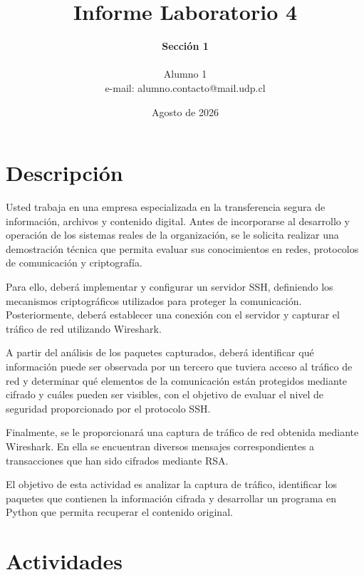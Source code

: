 \documentclass[letter,12pt]{article}
\begin{document}
%
   \title{\Huge{Informe Laboratorio 4}}

   \author{\textbf{Sección 1} \\  \\Alumno 1 \\ e-mail: alumno.contacto@mail.udp.cl}
          
   \date{Agosto de 2026}

   \maketitle
   
   \tableofcontents
 
  \newpage
  

\section{Descripción}
Usted trabaja en una empresa especializada en la transferencia segura de información, archivos y contenido digital. Antes de incorporarse al desarrollo y operación de los sistemas reales de la organización, se le solicita realizar una demostración técnica que permita evaluar sus conocimientos en redes, protocolos de comunicación y criptografía.

Para ello, deberá implementar y configurar un servidor SSH, definiendo los mecanismos criptográficos utilizados para proteger la comunicación. Posteriormente, deberá establecer una conexión con el servidor y capturar el tráfico de red utilizando Wireshark.

A partir del análisis de los paquetes capturados, deberá identificar qué información puede ser observada por un tercero que tuviera acceso al tráfico de red y determinar qué elementos de la comunicación están protegidos mediante cifrado y cuáles pueden ser visibles, con el objetivo de evaluar el nivel de seguridad proporcionado por el protocolo SSH.

Finalmente, se le proporcionará una captura de tráfico de red obtenida mediante Wireshark. En ella se encuentran diversos mensajes correspondientes a transacciones que han sido cifrados mediante RSA.

El objetivo de esta actividad es analizar la captura de tráfico, identificar los paquetes que contienen la información cifrada y desarrollar un programa en Python que permita recuperar el contenido original.

\section{Actividades}
\end{document}
